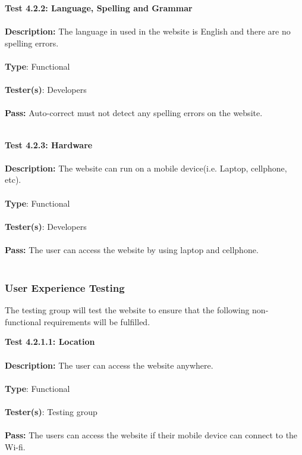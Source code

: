 \documentclass[12pt]{article}
\begin{document}
\begin{tcolorbox}
\textbf{Test 4.2.2: Language, Spelling and Grammar} \\ \\
\textbf{Description:} The language in used in the website is English and there are no spelling errors. \\ \\
\textbf{Type}: Functional \\ \\
\textbf{Tester(s)}: Developers \\ \\
\textbf{Pass:} Auto-correct must not detect any spelling errors on the website. \\ \\
\end{tcolorbox}

\begin{tcolorbox}
\textbf{Test 4.2.3: Hardware} \\ \\
\textbf{Description:} The website can run on a mobile device(i.e. Laptop, cellphone, etc). \\ \\
\textbf{Type}: Functional \\ \\
\textbf{Tester(s)}: Developers \\ \\
\textbf{Pass:} The user can access the website by using laptop and cellphone. \\ \\
\end{tcolorbox}

\subsubsection{User Experience Testing}
The testing group will test the website to ensure that the following non-functional requirements will be fulfilled.

\begin{tcolorbox}
\textbf{Test 4.2.1.1: Location} \\ \\
\textbf{Description:} The user can access the website anywhere. \\ \\
\textbf{Type}: Functional  \\ \\
\textbf{Tester(s)}: Testing group \\ \\
\textbf{Pass:} The users can access the website if their mobile device can connect to the Wi-fi. \\ \\
\end{tcolorbox}
\end{document}
